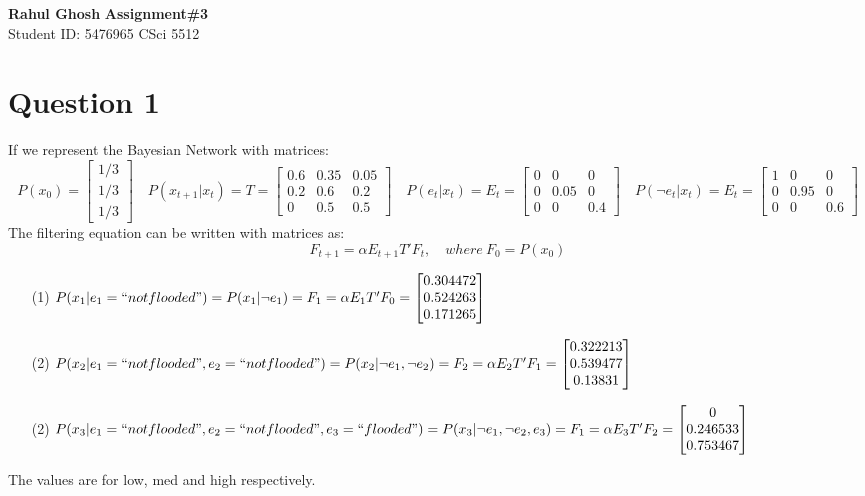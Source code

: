 \documentclass[letter, 10pt]{article}
\begin{document}
\noindent
\large \textbf{Rahul Ghosh} \hfill \textbf{Assignment\#3}\\
\normalsize Student ID: 5476965 \hfill CSci 5512\\

\section*{Question 1}
If we represent the Bayesian Network with matrices:
\begin{equation*}
    P(x_0) = 
    \begin{bmatrix}
        1/3\\
        1/3\\
        1/3
    \end{bmatrix}
    \quad
    P(x_{t+1}|x_t) = T =
    \begin{bmatrix}
        0.6 & 0.35 & 0.05 \\
        0.2 & 0.6 & 0.2 \\
        0 & 0.5 & 0.5
    \end{bmatrix}
    \quad
    P(e_t|x_t) = E_t =
    \begin{bmatrix}
        0 & 0 & 0 \\
        0 & 0.05 & 0 \\
        0 & 0 & 0.4
    \end{bmatrix}
    \quad
    P(\neg e_t|x_t) = E_t =
    \begin{bmatrix}
        1 & 0 & 0 \\
        0 & 0.95 & 0 \\
        0 & 0 & 0.6
    \end{bmatrix}
\end{equation*}
The filtering equation can be written with matrices as:
\begin{equation*}
    F_{t+1} = \alpha E_{t+1}T'F_t, \quad where\ F_0 = P(x_0)
\end{equation*}
\begin{itemize}
    \item[(1)] $P(x_1|e_1=``not flooded") = P(x_1| \neg e_1) = F_1 = \alpha E_1T'F_0 = 
    \begin{bmatrix}
        0.304472\\
        0.524263\\
        0.171265
    \end{bmatrix}$
    \item[(2)] $P(x_2|e_1=``not flooded", e_2=``not flooded") = P(x_2|\neg e_1, \neg e_2) = F_2 = \alpha E_2T'F_1 = 
    \begin{bmatrix}
        0.322213\\
        0.539477\\
        0.13831
    \end{bmatrix}$
    \item[(2)] $P(x_3|e_1=``not flooded", e_2=``not flooded", e_3=``flooded") = P(x_3| \neg e_1, \neg e_2, e_3) = F_1 = \alpha E_3T'F_2 = 
    \begin{bmatrix}
        0\\
        0.246533\\
        0.753467
    \end{bmatrix}$
\end{itemize}
The values are for low, med and high respectively.
\end{document}
